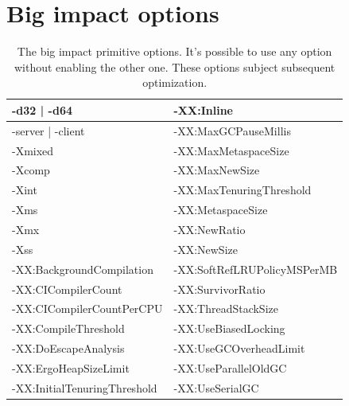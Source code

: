 \documentclass[
  digital, %
  oneside,
  notable, %
  nolof,     %
  nolot     %
]{fithesis3}
\begin{document}
\chapter{Big impact options}
\begin{table}[]
	\centering
	\begin{tabular}{|l|l|}
		\hline
		-d32 | -d64                   & -XX:Inline                  \\ \hline
		-server | -client             & -XX:MaxGCPauseMillis        \\ \hline
		-Xmixed                       & -XX:MaxMetaspaceSize        \\ \hline
		-Xcomp                        & -XX:MaxNewSize              \\ \hline
		-Xint                         & -XX:MaxTenuringThreshold    \\ \hline
		-Xms						  & -XX:MetaspaceSize           \\ \hline
		-Xmx						  & -XX:NewRatio                \\ \hline
		-Xss						  & -XX:NewSize                 \\ \hline
		-XX:BackgroundCompilation     & -XX:SoftRefLRUPolicyMSPerMB \\ \hline
		-XX:CICompilerCount           & -XX:SurvivorRatio           \\ \hline
		-XX:CICompilerCountPerCPU     & -XX:ThreadStackSize         \\ \hline
		-XX:CompileThreshold          & -XX:UseBiasedLocking        \\ \hline
		-XX:DoEscapeAnalysis          & -XX:UseGCOverheadLimit      \\ \hline
		-XX:ErgoHeapSizeLimit         & -XX:UseParallelOldGC        \\ \hline
		-XX:InitialTenuringThreshold  & -XX:UseSerialGC             \\ \hline
	\end{tabular}
	\caption{The big impact primitive options. It's possible to use any option without enabling the other one. These options subject subsequent optimization.}
	\label{bigimpactprimitive}
\end{table}
	
	
	
\end{document}
